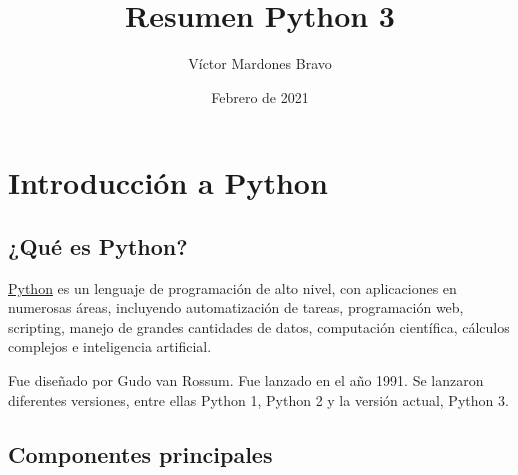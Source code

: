 \documentclass{report}
\title{Resumen Python 3}
\author{Víctor Mardones Bravo}
\date{Febrero de 2021}
\newcommand{\link}[2]{\href{#1}{\underline{#2}}}
\begin{document}

\null
\nointerlineskip
\vfill
\let\snewpage \newpage
\let\newpage \relax
  {\centering\def\svgwidth{\columnwidth}
  }
\maketitle
\let \newpage \snewpage
\vfill 
\break

\clearpage

\tableofcontents

\clearpage


\chapter{Introducción a Python}

\section{¿Qué es Python?}

\link{https://www.python.org}{Python} es un lenguaje de programación de alto nivel, con aplicaciones en numerosas áreas, incluyendo automatización de tareas, programación web, scripting, manejo de grandes cantidades de datos, computación científica, cálculos complejos e inteligencia artificial.\smallskip

Fue diseñado por Gudo van Rossum. Fue lanzado en el año 1991. Se lanzaron diferentes versiones, entre ellas Python 1, Python 2 y la versión actual, Python 3.

\section{Componentes principales}
\end{document}
